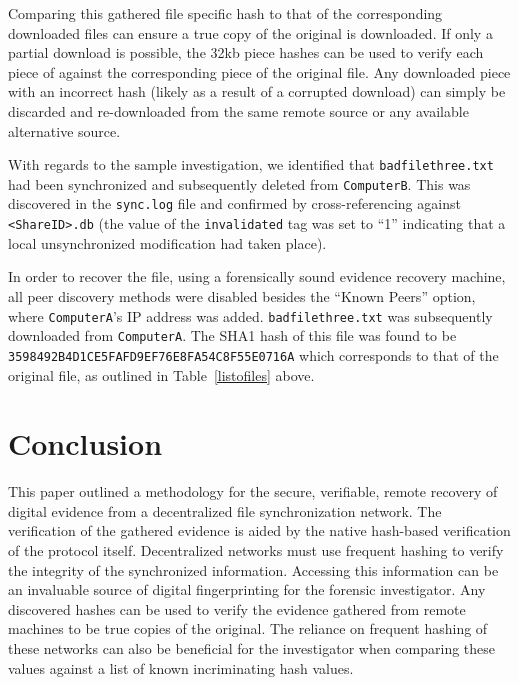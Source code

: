 \documentclass{jdfsl}
\begin{document}
Comparing this gathered file specific hash to that of the corresponding downloaded files can ensure a true copy of the original is downloaded. If only a partial download is possible, the 32kb piece hashes can be used to verify each piece of against the corresponding piece of the original file. Any downloaded piece with an incorrect hash (likely as a result of a corrupted download) can simply be discarded and re-downloaded from the same remote source or any available alternative source. 

With regards to the sample investigation, we identified that \texttt{badfilethree.txt} had been synchronized and subsequently deleted from \texttt{ComputerB}. This was discovered in the \texttt{sync.log} file and confirmed by cross-referencing against \texttt{<ShareID>.db} 
(the value of the \texttt{invalidated} tag was set to ``1'' indicating that a local unsynchronized modification had taken place). 

In order to recover the file, using a forensically sound evidence recovery machine, all peer discovery methods were disabled besides the ``Known Peers'' option, where \texttt{ComputerA}'s IP address was added. \texttt{badfilethree.txt} was subsequently downloaded from \texttt{ComputerA}. The SHA1 hash of this file was found to be \texttt{3598492B4D1CE5FAFD9EF76E8FA54C8F55E0716A} which corresponds to that of the original file, as outlined in Table~\ref{listofiles} above.\\




\section{Conclusion}
\label{conclusion}
This paper outlined a methodology for the secure, verifiable, remote recovery of digital evidence from a decentralized file synchronization network. The verification of the gathered evidence is aided by the native hash-based verification of the protocol itself. Decentralized networks must use frequent hashing to verify the integrity of the synchronized information. Accessing this information can be an invaluable source of digital fingerprinting for the forensic investigator. Any discovered hashes can be used to verify the evidence gathered from remote machines to be true copies of the original. The reliance on frequent hashing of these networks can also be beneficial for the investigator when comparing these values against a list of known incriminating hash values.\\
\end{document}
